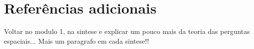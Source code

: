 \section{Referências adicionais}



Voltar no modulo 1, na sintese e explicar um pouco mais da teoria das perguntas espaciais...
Mais um paragrafo em cada sintese!!